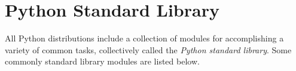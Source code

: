 \begin{warn}
\begin{comment}
\begin{lstlisting}
In [1]: import example2

In [2]: example2.sum_of_squares(3)
Out[2]: 5
\end{lstlisting}

Since $1^2 + 2^2 + 3^2 = 14$, not $5$, something has gone wrong.
We modify the source file to correct the mistake:

\begin{lstlisting}
# example2.py

def sum_of_squares(x):
    """Return the sum of the squares of all positive integers
    less than or equal to x.
    """
    return sum([i**2 for i in range(1,x+1)])    # Include the final term.
\end{lstlisting}

Back in IPython, import the module again and see if the function acts differently.

\begin{lstlisting}
# Using import again doesn't change the loaded module, even though
# the source file was modified.
In [3]: import example2

In [4]: example2.sum_of_squares(3)
Out[4]: 5
\end{lstlisting}
\end{comment}
\end{warn}



\newpage
\section*{Python Standard Library} %

All Python distributions include a collection of modules for accomplishing a variety of common tasks, collectively called the \emph{Python standard library}.
Some commonly standard library modules are listed below.

